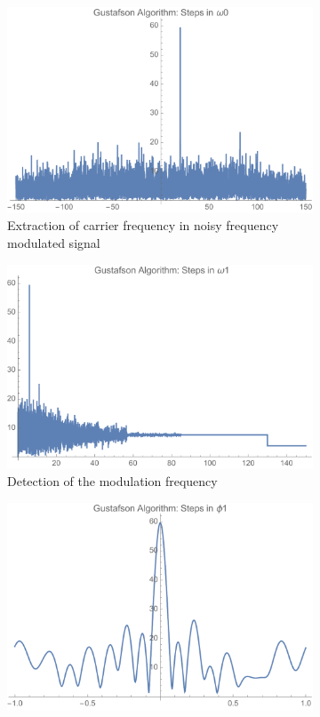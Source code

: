 \documentclass[onecolumn, groupedaddress, 10pt]{revtex4-1}
\begin{document}
\begin{figure}[H]
	\centering	
	\begin{subfigure}{.5\textwidth}
  		\centering
  		\includegraphics[width=.9\linewidth]{gustafsonAlgoStepInCarrier.pdf}
  		\caption{\label{fig:results5} Extraction of carrier frequency in noisy frequency modulated signal}
	\end{subfigure}%
	\begin{subfigure}{.5\textwidth}
  		\centering
  		\includegraphics[width=.9\linewidth]{gustafsonAlgoStepInModFreq.pdf}
  		\caption{\label{fig:results6} Detection of the modulation frequency}
	\end{subfigure}
	\begin{subfigure}{.5\textwidth}
  		\centering
  		\includegraphics[width=.9\linewidth]{gustafsonAlgoStepInPhi1.pdf}

\end{subfigure}
\end{figure}
\end{document}
